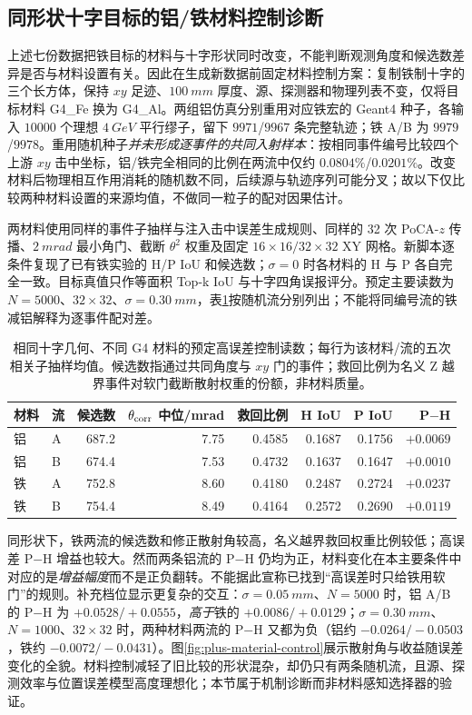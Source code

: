 \documentclass[UTF8,fontset=none,zihao=-4,a4paper]{ctexart}
\begin{document}
\subsection{同形状十字目标的铝/铁材料控制诊断}
上述七份数据把铁目标的材料与十字形状同时改变，不能判断观测角度和候选数差异是否与材料设置有关。因此在生成新数据前固定材料控制方案：复制铁制十字的三个长方体，保持 $xy$ 足迹、$\SI{100}{mm}$ 厚度、源、探测器和物理列表不变，仅将目标材料 G4\_Fe 换为 G4\_Al。两组铝仿真分别重用对应铁宏的 Geant4 种子，各输入 $\num{10000}$ 个理想 $\SI{4}{GeV}$ 平行缪子，留下 $\num{9971}$/$\num{9967}$ 条完整轨迹；铁 A/B 为 $\num{9979}$/$\num{9978}$。重用随机种子\emph{并未形成逐事件的共同入射样本}：按相同事件编号比较四个上游 $xy$ 击中坐标，铝/铁完全相同的比例在两流中仅约 $0.0804\%$/$0.0201\%$。改变材料后物理相互作用消耗的随机数不同，后续源与轨迹序列可能分叉；故以下仅比较两种材料设置的来源均值，不做同一粒子的配对因果估计。

两材料使用同样的事件子抽样与注入击中误差生成规则、同样的 32 次 PoCA-$z$ 传播、$\SI{2}{mrad}$ 最小角门、截断 $\theta^2$ 权重及固定 $16\times16/32\times32$ XY 网格。新脚本逐条件复现了已有铁实验的 H/P IoU 和候选数；$\sigma=0$ 时各材料的 H 与 P 各自完全一致。目标真值只作等面积 Top-k IoU 与十字四角误报评分。预定主要读数为 $N=5000$、$32\times32$、$\sigma=\SI{0.30}{mm}$，表\ref{tab:plus-material-control}按随机流分别列出；不能将同编号流的铁减铝解释为逐事件配对差。

\begin{table}[H]
\centering
\caption{相同十字几何、不同 G4 材料的预定高误差控制读数；每行为该材料/流的五次相关子抽样均值。候选数指通过共同角度与 $xy$ 门的事件；救回比例为名义 Z 越界事件对软门截断散射权重的份额，非材料质量。}
\label{tab:plus-material-control}
\small
\begin{tabular}{llrrrrrr}
\toprule
材料 & 流 & 候选数 & $\theta_{\rm corr}$ 中位/mrad & 救回比例 & H IoU & P IoU & P$-$H\\
\midrule
铝 & A & 687.2 & 7.75 & 0.4585 & 0.1687 & 0.1756 & $+0.0069$\\
铝 & B & 674.4 & 7.53 & 0.4732 & 0.1637 & 0.1647 & $+0.0010$\\
铁 & A & 752.8 & 8.60 & 0.4180 & 0.2487 & 0.2724 & $+0.0237$\\
铁 & B & 754.4 & 8.49 & 0.4164 & 0.2572 & 0.2690 & $+0.0119$\\
\bottomrule
\end{tabular}
\end{table}

同形状下，铁两流的候选数和修正散射角较高，名义越界救回权重比例较低；高误差 P$-$H 增益也较大。然而两条铝流的 P$-$H 仍均为正，材料变化在本主要条件中对应的是\emph{增益幅度}而不是正负翻转。不能据此宣称已找到“高误差时只给铁用软门”的规则。补充档位显示更复杂的交互：$\sigma=\SI{0.05}{mm}$、$N=5000$ 时，铝 A/B 的 P$-$H 为 $+0.0528/+0.0555$，\emph{高于}铁的 $+0.0086/+0.0129$；$\sigma=\SI{0.30}{mm}$、$N=1000$、$32\times32$ 时，两种材料两流的 P$-$H 又都为负（铝约 $-0.0264/-0.0503$，铁约 $-0.0072/-0.0431$）。图\ref{fig:plus-material-control}展示散射角与收益随误差变化的全貌。材料控制减轻了旧比较的形状混杂，却仍只有两条随机流，且源、探测效率与位置误差模型高度理想化；本节属于机制诊断而非材料感知选择器的验证。
\end{document}
